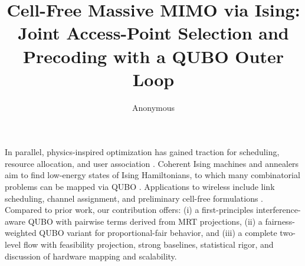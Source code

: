 {In parallel, physics-inspired optimization has gained traction for scheduling, resource allocation, and user association \cite{kasi2021resource,grassl2022ising}. Coherent Ising machines and annealers aim to find low-energy states of Ising Hamiltonians, to which many combinatorial problems can be mapped via QUBO \cite{lucas2014ising,mcmahon2016fully,inagaki2016coherent,glover2018tutorial}. Applications to wireless include link scheduling, channel assignment, and preliminary cell-free formulations \cite{zhao2022joint}. Compared to prior work, our contribution offers: (i) a first-principles interference-aware QUBO with pairwise terms derived from MRT projections, (ii) a fairness-weighted QUBO variant for proportional-fair behavior, and (iii) a complete two-level flow with feasibility projection, strong baselines, statistical rigor, and discussion of hardware mapping and scalability.

\usepackage{algorithm}
\usepackage{algpseudocode}
\usepackage{booktabs}
\usepackage{siunitx}
\usepackage{cite}
\usepackage{hyperref}
\hypersetup{colorlinks=true, linkcolor=black, citecolor=black, urlcolor=black}

\newcommand{\E}{\mathbb{E}}
\newcommand{\R}{\mathbb{R}}
\newcommand{\1}{\mathbf{1}}



\title{Cell-Free Massive MIMO via Ising: Joint Access-Point Selection and Precoding with a QUBO Outer Loop}

\author{Anonymous}
\maketitle

}
